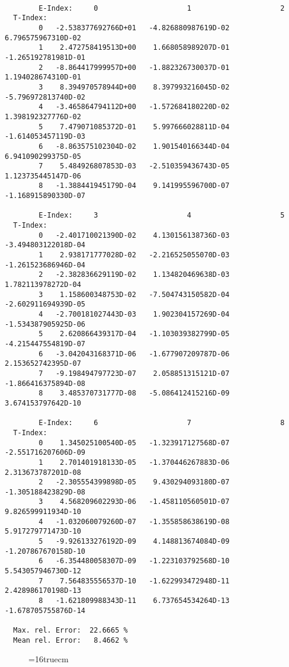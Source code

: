 \documentclass[12pt,dvipdfmx]{article}
\begin{document}
\begin{small}\begin{verbatim}

        E-Index:     0                     1                     2
  T-Index:
        0   -2.538377692766D+01   -4.826880987619D-02    6.796575967310D-02
        1    2.472758419513D+00    1.668058989207D-01   -1.265192781981D-01
        2   -8.864417999957D+00   -1.882326730037D-01    1.194028674310D-01
        3    8.394970578944D+00    8.397993216045D-02   -5.796972813740D-02
        4   -3.465864794112D+00   -1.572684180220D-02    1.398192327776D-02
        5    7.479071085372D-01    5.997666028811D-04   -1.614053457119D-03
        6   -8.863575102304D-02    1.901540166344D-04    6.941090299375D-05
        7    5.484926807853D-03   -2.510359436743D-05    1.123735445147D-06
        8   -1.388441945179D-04    9.141995596700D-07   -1.168915890330D-07

        E-Index:     3                     4                     5
  T-Index:
        0   -2.401710021390D-02    4.130156138736D-03   -3.494803122018D-04
        1    2.938171777028D-02   -2.216525055070D-03   -1.261523686946D-04
        2   -2.382836629119D-02    1.134820469638D-03    1.782113978272D-04
        3    1.158600348753D-02   -7.504743150582D-04   -2.602911694939D-05
        4   -2.700181027443D-03    1.902304157269D-04   -1.534387905925D-06
        5    2.620866439317D-04   -1.103039382799D-05   -4.215447554819D-07
        6   -3.042043168371D-06   -1.677907209787D-06    2.153652742395D-07
        7   -9.198494797723D-07    2.058851315121D-07   -1.866416375894D-08
        8    3.485370731777D-08   -5.086412415216D-09    3.674153797642D-10

        E-Index:     6                     7                     8
  T-Index:
        0    1.345025100540D-05   -1.323917127568D-07   -2.551716207606D-09
        1    2.701401918133D-05   -1.370446267883D-06    2.313673787201D-08
        2   -2.305554399898D-05    9.430294093180D-07   -1.305188423829D-08
        3    4.568209602293D-06   -1.458110560501D-07    9.826599911934D-10
        4   -1.032060079260D-07   -1.355858638619D-08    5.917279771473D-10
        5   -9.926133276192D-09    4.148813674084D-09   -1.207867670158D-10
        6   -6.354480058307D-09   -1.223103792568D-10    5.543057946730D-12
        7    7.564835556537D-10   -1.622993472948D-11    2.428986170198D-13
        8   -1.621809988343D-11    6.737654534264D-13   -1.678705755876D-14

  Max. rel. Error:  22.6665 %
  Mean rel. Error:   8.4662 %
\end{verbatim}\end{small}
\begin{figure} \label{2.3.13aer}
\epsfxsize=16truecm
\end{figure}
\newpage
\end{document}

